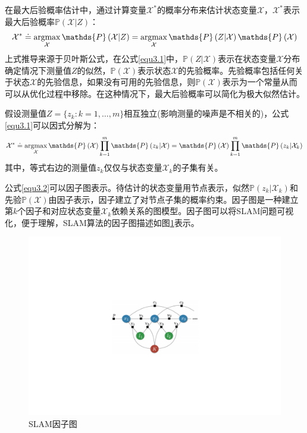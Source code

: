 在最大后验概率估计中，通过计算变量$\mathcal{X}^*$的概率分布来估计状态变量$\mathcal{X}$，$\mathcal{X}^*$表示最大后验概率$\mathds{P}\left(\mathcal{X} \vert Z\right)$：
\begin{equation}
\label{equ3.1}
\mathcal{X}^* 
\doteq 
\argmax \limits_{\mathcal{X}} \mathds{P}\left(\mathcal{X} \vert Z\right) 
=
\argmax \limits_{\mathcal{X}}\mathds{P}\left(Z \vert \mathcal{X}  \right)\mathds{P}\left(\mathcal{X}\right)
\end{equation}
上式推导来源于贝叶斯公式，在公式\eqref{equ3.1}中，$\mathds{P}\left(Z \vert \mathcal{X}  \right)$表示在状态变量$\mathcal{X}$分布确定情况下测量值$Z$的似然，$\mathds{P}\left(\mathcal{X}\right)$表示状态$\mathcal{X}$的先验概率。先验概率包括任何关于状态$\mathcal{X}$的先验信息，如果没有可用的先验信息，则$\mathds{P}\left(\mathcal{X}\right)$表示为一个常量从而可以从优化过程中移除。在这种情况下，最大后验概率可以简化为极大似然估计。

假设测量值$Z=\lbrace z_k:k=1,\ldots ,m\rbrace$相互独立(影响测量的噪声是不相关的)，公式\eqref{equ3.1}可以因式分解为：
\begin{equation}
\label{equ3.2}
\mathcal{X}^* 
\doteq 
\argmax \limits_{\mathcal{X}} \mathds{P}\left(\mathcal{X}\right) \prod \limits_{k=1}^{m} \mathds{P}\left(z_k \vert \mathcal{X}  \right)
=
\mathds{P}\left(\mathcal{X}\right) \prod \limits_{k=1}^{m} \mathds{P}\left(z_k \vert \mathcal{X}_k  \right)
\end{equation}
其中，等式右边的测量值$z_k$仅仅与状态变量$\mathcal{X}_k$的子集有关。

公式\eqref{equ3.2}可以因子图\upcite{[3.3]}表示。待估计的状态变量用节点表示，似然$\mathds{P}\left(z_k \vert \mathcal{X}_k  \right)$和先验$\mathds{P}\left(\mathcal{X} \right)$由因子表示，因子建立了对节点子集的概率约束。因子图是一种建立第$k$个因子和对应状态变量$\mathcal{X}_k$依赖关系的图模型。因子图可以将SLAM问题可视化，便于理解，SLAM算法的因子图描述如图\ref{fig3.3}表示。

\begin{figure}
\centering
\includegraphics[scale=0.5,angle=-90]{figures/Fig3-3.pdf}
\caption{SLAM因子图}
\label{fig3.3}
\end{figure}


